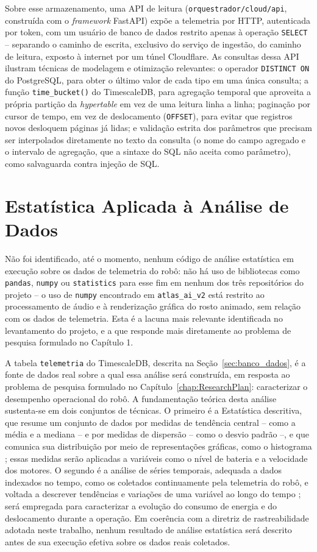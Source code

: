 Sobre esse armazenamento, uma API de leitura (\texttt{orquestrador/cloud/api}, construída com o \textit{framework} FastAPI) expõe a telemetria por HTTP, autenticada por token, com um usuário de banco de dados restrito apenas à operação \texttt{SELECT} -- separando o caminho de escrita, exclusivo do serviço de ingestão, do caminho de leitura, exposto à internet por um túnel Cloudflare. As consultas dessa API ilustram técnicas de modelagem e otimização relevantes: o operador \texttt{DISTINCT ON} do PostgreSQL, para obter o último valor de cada tipo em uma única consulta; a função \texttt{time\_bucket()} do TimescaleDB, para agregação temporal que aproveita a própria partição da \textit{hypertable} em vez de uma leitura linha a linha; paginação por cursor de tempo, em vez de deslocamento (\texttt{OFFSET}), para evitar que registros novos desloquem páginas já lidas; e validação estrita dos parâmetros que precisam ser interpolados diretamente no texto da consulta (o nome do campo agregado e o intervalo de agregação, que a sintaxe do SQL não aceita como parâmetro), como salvaguarda contra injeção de SQL.

\section{Estatística Aplicada à Análise de Dados} \label{sec:estatistica}
Não foi identificado, até o momento, nenhum código de análise estatística em execução sobre os dados de telemetria do robô: não há uso de bibliotecas como \texttt{pandas}, \texttt{numpy} ou \texttt{statistics} para esse fim em nenhum dos três repositórios do projeto -- o uso de \texttt{numpy} encontrado em \texttt{atlas\_ai\_v2} está restrito ao processamento de áudio e à renderização gráfica do rosto animado, sem relação com os dados de telemetria. Esta é a lacuna mais relevante identificada no levantamento do projeto, e a que responde mais diretamente ao problema de pesquisa formulado no Capítulo 1.

A tabela \texttt{telemetria} do TimescaleDB, descrita na Seção~\ref{sec:banco_dados}, é a fonte de dados real sobre a qual essa análise será construída, em resposta ao problema de pesquisa formulado no Capítulo~\ref{chap:ResearchPlan}: caracterizar o desempenho operacional do robô. A fundamentação teórica desta análise sustenta-se em dois conjuntos de técnicas. O primeiro é a Estatística descritiva, que resume um conjunto de dados por medidas de tendência central -- como a média e a mediana -- e por medidas de dispersão -- como o desvio padrão --, e que comunica sua distribuição por meio de representações gráficas, como o histograma \cite{bussab2017}; essas medidas serão aplicadas a variáveis como o nível de bateria e a velocidade dos motores. O segundo é a análise de séries temporais, adequada a dados indexados no tempo, como os coletados continuamente pela telemetria do robô, e voltada a descrever tendências e variações de uma variável ao longo do tempo \cite{morettin2018}; será empregada para caracterizar a evolução do consumo de energia e do deslocamento durante a operação. Em coerência com a diretriz de rastreabilidade adotada neste trabalho, nenhum resultado de análise estatística será descrito antes de sua execução efetiva sobre os dados reais coletados.

